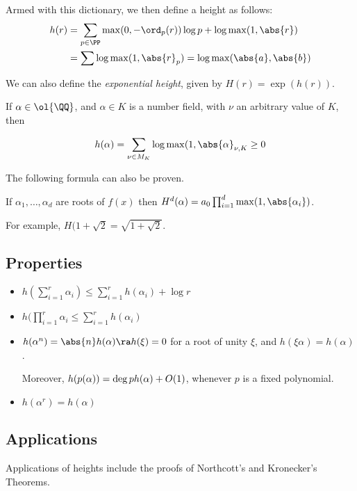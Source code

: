 \documentclass[11pt]{scrartcl}
\begin{document}
Armed with this dictionary, we then define a height as follows:
\begin{align}
  h(r) & = \sum_{p\in\PP} \max(0, -\ord_p(r))\log p + \log \max(1,\abs{r}) \\
       & = \sum \log \max(1, \abs{r}_p) = \log \max(\abs{a}, \abs{b})
\end{align}

We can also define the \textit{exponential height}, given by
$H(r) = \exp(h(r))$.

If $\alpha \in \ol{\QQ}$, and $\alpha \in K$ is a number field, with
$\nu$ an arbitrary value of $K$, then

\begin{equation*}
h(\alpha) = \sum_{\nu\in M_K}\log \max(1, \abs{\alpha}_{\nu, K} \geq 0
\end{equation*}

The following formula can also be proven.

\begin{theorem}
  If $\alpha_1, \dots, \alpha_d$ are roots of $f(x)$ then
  $H^d(\alpha) = a_0\prod_{i=1}^d\max(1, \abs{\alpha_i})$.
\end{theorem}

For example, $H(1+\sqrt{2} = \sqrt{1+\sqrt{2}}$.

\subsection{Properties}

\begin{itemize}
\item $h(\sum_{i=1}^r \alpha_i) \leq \sum_{i=1}^rh(\alpha_i) + \log r$
\item $h(\prod_{i=1}^r \alpha_i \leq \sum_{i=1}^rh(\alpha_i)$
\item $h(\alpha^n) = \abs{n} h(\alpha) \ra h(\xi) = 0$ for a root of unity $\xi$, and $h(\xi \alpha) = h(\alpha)$.

  Moreover, $h(p(\alpha)) = \deg p \* h(\alpha) + O(1)$, whenever $p$
  is a fixed polynomial.
\item $h(\alpha^r) = h(\alpha)$
\end{itemize}

\subsection{Applications}
Applications of heights include the proofs of Northcott's and Kronecker's Theorems.
\end{document}
